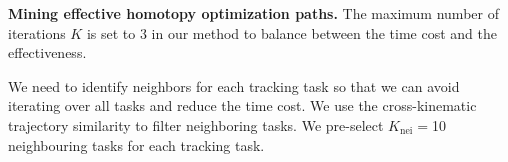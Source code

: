 




\noindent\textbf{Mining effective homotopy optimization paths.} The maximum number of iterations $K$ is set to $3$ in our method to balance between the time cost and the effectiveness. 

We need to identify neighbors for each tracking task so that we can avoid iterating over all tasks and reduce the time cost. We use the cross-kinematic trajectory similarity to filter neighboring tasks. We pre-select $K_{\text{nei}}=$10 neighbouring tasks for each tracking task. 



